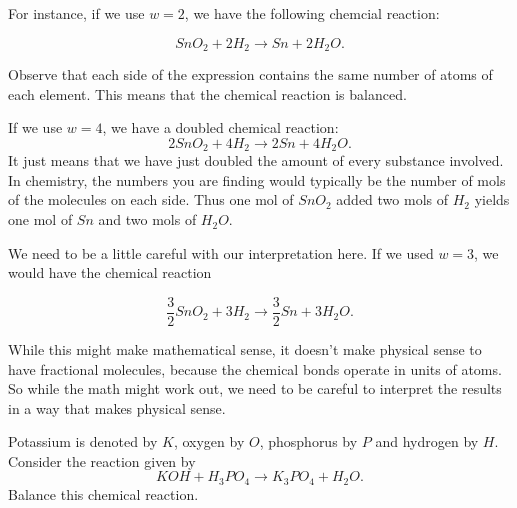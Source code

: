 \documentclass{ximera}
\begin{document}
\begin{exploration}
\begin{example}
For instance, if we use $w=2$, we have the following chemcial reaction: 

\begin{equation*}
  SnO_2+2H_2\rightarrow Sn+2H_2O.
\end{equation*}

Observe that each side of the expression contains the same number of
atoms of each element. This means that the chemical reaction is
balanced. 

If we use $w=4$, we have a doubled chemical reaction:
\begin{equation*}
  2SnO_2+4H_2\rightarrow 2Sn+4H_2O.
\end{equation*}
It just means that we have just doubled the amount of
every substance involved. In chemistry, the numbers you are finding
would typically be the number of mols of the molecules on each
side. Thus one mol of $SnO_2$ added two mols of $H_2$ yields one mol
of $Sn$ and two mols of $H_2O$.

\begin{remark}

  We need to be a little careful with our interpretation here. If we used $w=3$, we would have the chemical reaction

  \begin{equation*}
    \frac{3}{2}SnO_2+3H_2\rightarrow \frac{3}{2}Sn+3H_2O.
  \end{equation*}

  While this might make mathematical sense, it doesn't make physical sense to have fractional molecules, because the chemical bonds operate in units of atoms. So while the math might work out, we need to be careful to interpret the results in a way that makes physical sense.

\end{remark}

\end{example}


\begin{example}
  Potassium is denoted by $K$, oxygen by $O$, phosphorus by $P$ and
  hydrogen by $H$.  Consider the reaction given by
  \begin{equation*}
    KOH+H_3PO_4\rightarrow K_3PO_4+H_2O.
  \end{equation*}
  Balance this chemical reaction.



\end{example}
\end{exploration}
\end{document}
